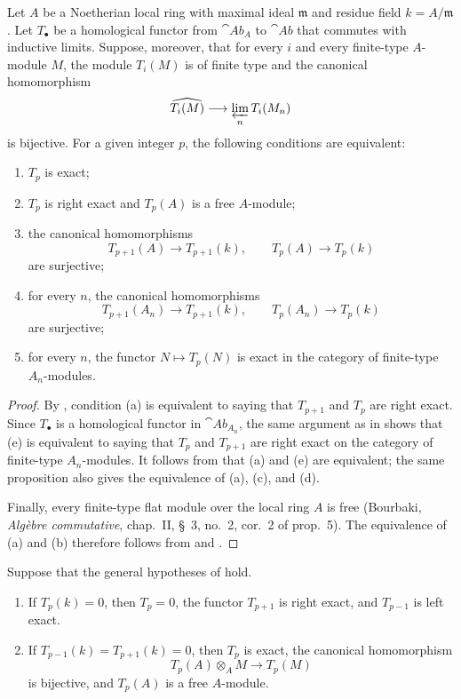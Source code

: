 \begin{proposition}[7.5.4]
\label{III.7.5.4}
Let $A$ be a Noetherian local ring with maximal ideal
$\mathfrak m$ and residue field $k=A/\mathfrak m$.  Let
$T_\bullet$ be a homological functor from $\cat{Ab}_A$ to
$\cat{Ab}$ that commutes with inductive limits.  Suppose,
moreover, that for every $i$ and every finite-type $A$-module
$M$, the module $T_i(M)$ is of finite type and the canonical
homomorphism
\[
  \widehat{T_i(M)}
  \longrightarrow
  \varprojlim_n T_i(M_n)
\]
is bijective.  For a given integer $p$, the following
conditions are equivalent:
\begin{enumerate}
  \item[(a)] $T_p$ is exact;
  \item[(b)] $T_p$ is right exact and $T_p(A)$ is a free
    $A$-module;
  \item[(c)] the canonical homomorphisms
    \[
      T_{p+1}(A)\longrightarrow T_{p+1}(k),
      \qquad
      T_p(A)\longrightarrow T_p(k)
    \]
    are surjective;
  \item[(d)] for every $n$, the canonical homomorphisms
    \[
      T_{p+1}(A_n)\longrightarrow T_{p+1}(k),
      \qquad
      T_p(A_n)\longrightarrow T_p(k)
    \]
    are surjective;
  \item[(e)] for every $n$, the functor $N\mapsto T_p(N)$ is
    exact in the category of finite-type $A_n$-modules.
\end{enumerate}
\end{proposition}

\begin{proof}
By , condition (a) is equivalent to saying
that $T_{p+1}$ and $T_p$ are right exact.  Since
$T_\bullet$ is a homological functor in $\cat{Ab}_{A_n}$, the
same argument as in  shows that (e) is
equivalent to saying that $T_p$ and $T_{p+1}$ are right exact
on the category of finite-type $A_n$-modules.  It follows from
 that (a) and (e) are equivalent; the same
proposition also gives the equivalence of (a), (c), and (d).

Finally, every finite-type flat module over the local ring
$A$ is free (Bourbaki, \emph{Alg\`ebre commutative},
chap.~II, \S~3, no.~2, cor.~2 of prop.~5).  The equivalence
of (a) and (b) therefore follows from  and
.
\end{proof}

\begin{corollary}[7.5.5]
\label{III.7.5.5}
Suppose that the general hypotheses of  hold.
\begin{enumerate}
  \item[(i)] If $T_p(k)=0$, then $T_p=0$, the functor
    $T_{p+1}$ is right exact, and $T_{p-1}$ is left exact.
  \item[(ii)] If $T_{p-1}(k)=T_{p+1}(k)=0$, then $T_p$ is
    exact, the canonical homomorphism
    \[
      T_p(A)\otimes_A M
      \longrightarrow
      T_p(M)
    \]
    is bijective, and $T_p(A)$ is a free $A$-module.
\end{enumerate}
\end{corollary}

